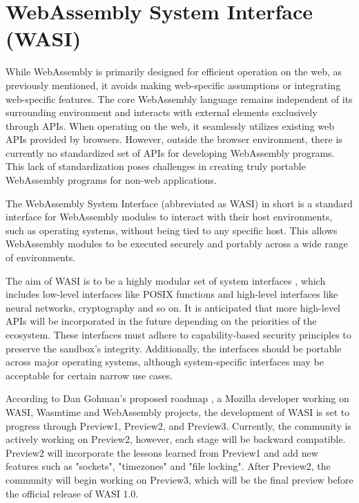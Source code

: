 \section{WebAssembly System Interface (WASI)}
\label{sec:wasi}

While WebAssembly is primarily designed for efficient operation on the web, as previously mentioned, it avoids making web-specific assumptions or integrating web-specific features. 
The core WebAssembly language remains independent of its surrounding environment and interacts with external elements exclusively through APIs. When operating on the web, it seamlessly utilizes existing web APIs provided by browsers. However, outside the browser environment, there is currently no standardized set of APIs for developing WebAssembly programs. This lack of standardization poses challenges in creating truly portable WebAssembly programs for non-web applications.

The WebAssembly System Interface (abbreviated as WASI) in short is a standard interface for WebAssembly modules to interact with their host environments, such as operating systems, without being tied to any specific host. This allows WebAssembly modules to be executed securely and portably across a wide range of environments. 

The aim of WASI is to be a highly modular set of system interfaces \cite{clark_2022_wasi}, which includes low-level interfaces like \gls{POSIX} functions and high-level interfaces like neural networks, cryptography and so on. 
It is anticipated that more high-level APIs will be incorporated in the future depending on the priorities of the ecosystem. These interfaces must adhere to capability-based security principles to preserve the sandbox's integrity. Additionally, the interfaces should be portable across major operating systems, although system-specific interfaces may be acceptable for certain 
narrow use cases.

According to Dan Gohman's proposed roadmap \cite{gohman_2023_wasi}, a Mozilla developer working on WASI, Wasmtime and WebAssembly projects, the development of WASI is set to progress through Preview1, Preview2, and Preview3. 
Currently, the community is actively working on Preview2, however, each stage will be backward compatible. Preview2 will incorporate the lessons learned from Preview1 and add new features such as "sockets", "timezones" and "file locking". After Preview2, the community will begin working on Preview3, which will be the final preview before the official release of WASI 1.0.

